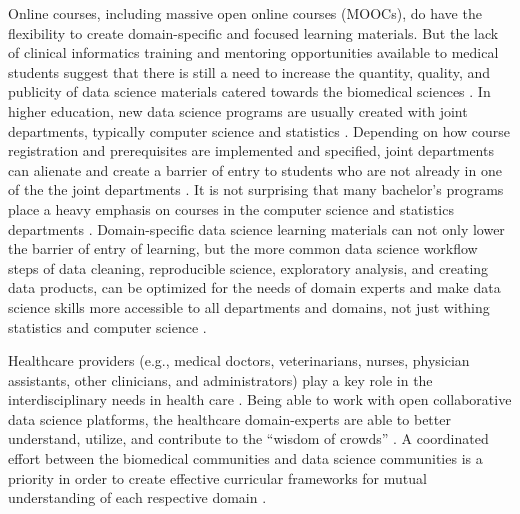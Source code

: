 \documentclass[020-persona\_validation.tex]{subfiles}
\begin{document}
    Online courses, including massive open online courses (MOOCs),
    do have the flexibility to create
    domain-specific and focused learning materials.
    But the lack of clinical informatics training and mentoring opportunities available to medical students
    suggest that there is still a need to increase the quantity, quality, and publicity of
    data science materials catered towards the biomedical sciences
    \cite{banerjeeMedicalStudentAwareness2015}.
    In higher education,
    new data science programs are usually created with joint departments,
    typically computer science and statistics
    \cite{songBigDataData2016}.
    Depending on how course registration and prerequisites are implemented and specified,
    joint departments can alienate and create a barrier of entry to students who are not already
    in one of the the joint departments
    \cite{kelleherLoweringBarriersProgramming2005}.
    It is not surprising that many bachelor's programs place a heavy emphasis on
    courses in the computer science and statistics departments
    \cite{songBigDataData2016}.
    Domain-specific data science learning materials can not only lower the barrier of entry of learning,
    but the more common data science workflow steps of
    data cleaning, reproducible science, exploratory analysis, and creating data products,
    can be optimized for the needs of domain experts and make
    data science skills more accessible to all departments and domains,
    not just withing statistics and computer science
    \cite{krossDemocratizationDataScience2020, cc2020, ccdsc2021, payneBiomedicalInformaticsMeets2018}.


    Healthcare providers (e.g., medical doctors, veterinarians, nurses, physician assistants, other clinicians, and administrators)
    play a key role in the interdisciplinary needs in health care
    \cite{surowiecki2005wisdom, hoytOverviewTwoOpen2018, payneBiomedicalInformaticsMeets2018}.
    Being able to work with open collaborative data science platforms,
    the healthcare domain-experts are able to better understand, utilize, and contribute to the
    ``wisdom of crowds''
    \cite{surowiecki2005wisdom, hoytOverviewTwoOpen2018, payneBiomedicalInformaticsMeets2018}.
    A coordinated effort between the biomedical communities and data science communities
    is a priority in order to create effective curricular frameworks for mutual understanding
    of each respective domain
    \cite{payneBiomedicalInformaticsMeets2018}.
\end{document}
